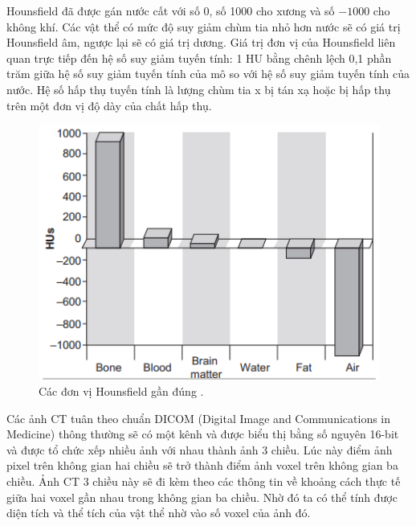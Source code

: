 Hounsfield đã được gán nước cất với số 0, số 1000 cho xương và số $-1000$ cho không khí. Các vật thể có mức độ suy giảm chùm tia nhỏ hơn nước sẽ có giá trị Hounsfield âm, ngược lại sẽ có giá trị dương. Giá trị đơn vị của Hounsfield liên quan trực tiếp đến hệ số suy giảm tuyến tính: 1 HU bằng chênh lệch 0,1 phần trăm  giữa hệ số suy giảm tuyến tính của mô so với hệ số suy giảm tuyến tính của nước. Hệ số hấp thụ tuyến tính là lượng chùm tia x bị tán xạ hoặc bị hấp thụ trên một đơn vị độ dày của chất hấp thụ. 

\begin{figure}[H]
    \centering
    \includegraphics[width=12cm]{images/medicine/img2.png}
    \caption{Các đơn vị Hounsfield gần đúng \cite{ctimage}. }
\end{figure}
\vspace{-0.5cm}
Các ảnh CT tuân theo chuẩn DICOM (Digital Image and Communications in Medicine) thông thường sẽ có một kênh và được biểu thị bằng số nguyên 16-bit và được tổ chức xếp nhiều ảnh với nhau thành ảnh 3 chiều. Lúc này điểm ảnh pixel trên không gian hai chiều sẽ trở thành điểm ảnh voxel trên không gian ba chiều. Ảnh CT 3 chiều này sẽ đi kèm theo các thông tin về khoảng cách thực tế giữa hai voxel gần nhau trong không gian ba chiều. Nhờ đó ta có thể tính được diện tích và thể tích của vật thể nhờ vào số voxel của ảnh đó.\par

